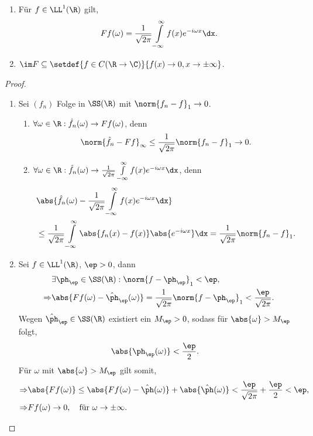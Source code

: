 \begin{prop}
\label{prop:2.31}
\begin{enumerate}
  \item Für $f\in\LL^1(\R)$ gilt,
\begin{align*}
Ff(\omega) = \frac{1}{\sqrt{2\pi}}\int\limits_{-\infty}^\infty f(x)e^{-i\omega
x}\dx.
\end{align*}
\item $\im F\subseteq \setdef{f\in C(\R\to\C)}{f(x)\to0,x\to\pm\infty}$.
\end{enumerate}
\end{prop}
\begin{proof}
\begin{enumerate}[label=\arabic{*}.)]
  \item Sei $(f_n)$ Folge in $\SS(\R)$ mit $\norm{f_n-f}_1 \to 0$.
\begin{enumerate}[label=\alph{*})]
  \item $\forall \omega\in\R: \hat{f}_n(\omega) \to Ff(\omega)$, denn
\begin{align*}
\norm{\hat{f}_n - Ff}_\infty \le \frac{1}{\sqrt{2\pi}}\norm{f_n-f}_1 \to 0.
\end{align*}
  \item $\forall \omega\in\R: \hat{f}_n(\omega) \to \frac{1}{\sqrt{2\pi}}\int\limits_{-\infty}^\infty
f(x)e^{-i\omega x}\dx$, denn
\begin{align*}
&\abs{\hat{f}_n(\omega)-\frac{1}{\sqrt{2\pi}}\int\limits_{-\infty}^\infty
f(x)e^{-i\omega x}\dx }\\
&\le
\frac{1}{\sqrt{2\pi}}\int\limits_{-\infty}^\infty
\abs{f_n(x)-f(x)}\abs{e^{-i\omega x}}\dx = \frac{1}{\sqrt{2\pi}}\norm{f_n-f}_1.
\end{align*}
\end{enumerate}
  \item Sei $f\in\LL^1(\R)$, $\ep >0$, dann
\begin{align*}
&\exists \ph_\ep\in \SS(\R) : \norm{f-\ph_\ep}_1<\ep,\\
\Rightarrow &
\abs{Ff(\omega)-\hat{\ph}_\ep(\omega)} = 
\frac{1}{\sqrt{2\pi}}\norm{f-\ph_\ep}_1
< \frac{\ep}{\sqrt{2\pi}}.
\end{align*}
Wegen $\hat{\ph}_\ep\in\SS(\R)$ existiert ein  $M_\ep > 0$, sodass für
$\abs{\omega}>M_\ep$ folgt,
\begin{align*}
&\abs{\ph_\ep(\omega)} < \frac{\ep}{2}.
\end{align*}
Für $\omega$ mit $\abs{\omega}>M_\ep$ gilt somit,
\begin{align*}
\Rightarrow &
\abs{Ff(\omega)} \le \abs{Ff(\omega)-\hat{\ph}(\omega)} +
\abs{\hat{\ph}(\omega)} < \frac{\ep}{\sqrt{2\pi}} + \frac{\ep}{2} < \ep,\\
\Rightarrow&
Ff(\omega) \to 0,\quad \text{für }\omega\to\pm\infty.\qedhere
\end{align*}
\end{enumerate}
\end{proof}

